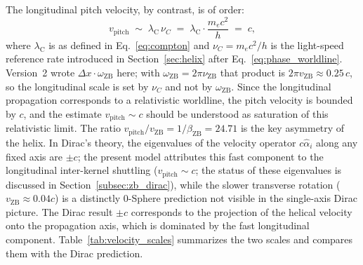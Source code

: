 \documentclass[%
 reprint, amsmath,amssymb, aps, prb, ]{revtex4-2}
\numberwithin{equation}{section}
\newcommand{\omZB}{\omega_{\text{ZB}}}
\newcommand{\lambdaC}{\lambda_{\mathrm{C}}}
\begin{document}
The longitudinal pitch velocity, by contrast, is of order:
\begin{equation}
v_{\text{pitch}} \;\sim\; \lambdaC\,\nu_C \;=\; \lambdaC \cdot \frac{m_ec^2}{h} \;=\; c,
\label{eq:pitch_velocity}
\end{equation}
where $\lambdaC$ is as defined in Eq.~\eqref{eq:compton} and $\nu_C = m_ec^2/h$ is the light-speed reference rate introduced in Section~\ref{sec:helix} after Eq.~\eqref{eq:phase_worldline}. Version~2 wrote $\Delta x\cdot\omZB$ here; with $\omZB = 2\pi\nu_{\mathrm{ZB}}$ that product is $2\pi v_{\mathrm{ZB}} \approx 0.25\,c$, so the longitudinal scale is set by $\nu_C$ and not by $\omZB$. Since the longitudinal propagation corresponds to a relativistic worldline, the pitch velocity is bounded by $c$, and the estimate $v_{\text{pitch}} \sim c$ should be understood as saturation of this relativistic limit. The ratio $v_{\text{pitch}}/v_{\mathrm{ZB}} = 1/\beta_{\mathrm{ZB}} = 24.71$ is the key asymmetry of the helix. In Dirac's theory, the eigenvalues of the velocity operator $c\hat{\alpha}_i$ along any fixed axis are $\pm c$; the present model attributes this fast component to the longitudinal inter-kernel shuttling ($v_{\text{pitch}}\sim c$; the status of these eigenvalues is discussed in Section~\ref{subsec:zb_dirac}), while the slower transverse rotation ($v_{\mathrm{ZB}}\approx 0.04c$) is a distinctly 0-Sphere prediction not visible in the single-axis Dirac picture. The Dirac result $\pm c$ corresponds to the projection of the helical velocity onto the propagation axis, which is dominated by the fast longitudinal component. Table~\ref{tab:velocity_scales} summarizes the two scales and compares them with the Dirac prediction.
\end{document}
